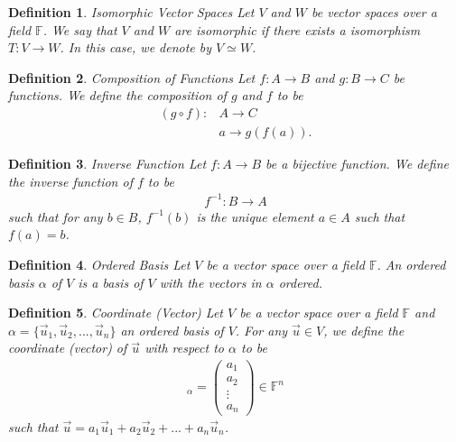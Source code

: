 \documentclass[12pt,answers]{exam}
\newcommand{\F}{\mathbb{F}}
\newtheorem{definition}{Definition}[section]
\begin{document}
\begin{definition}{Isomorphic Vector Spaces}
Let $V$ and $W$ be vector spaces over a field $\F$. We say that $V$ and $W$ are isomorphic if there exists a isomorphism $T:V\rightarrow W$. In this case, we denote by $V\simeq W$. 
\end{definition}

\begin{definition}{Composition of Functions}
Let $f:A\rightarrow B$ and $g:B\rightarrow C$ be functions. We define the composition of $g$ and $f$ to be
\begin{align*}
	(g\circ f):&A\rightarrow C \\
	& a \rightarrow g(f(a)).
\end{align*}
\end{definition}

\begin{definition}{Inverse Function}
Let $f:A\rightarrow B$ be a bijective function. We define the inverse function of $f$ to be
\begin{align*}
	f^{-1}:B\rightarrow A
\end{align*} such that for any $b\in B$, $f^{-1}(b)$ is the unique element $a\in A$ such that $f(a)=b$.
\end{definition}

\begin{definition}{Ordered Basis}
Let $V$ be a vector space over a field $\F$. An ordered basis $\alpha$ of $V$ is a basis of $V$ with the vectors in $\alpha$ ordered.
\end{definition}

\begin{definition}{Coordinate (Vector)}
Let $V$ be a vector space over a field $\F$ and $\alpha=\{\vec{u}_1,\vec{u}_{2},...,\vec{u}_n\}$ an ordered basis of $V$. For any $\vec{u}\in V$, we define the coordinate (vector) of $\vec{u}$ with respect to $\alpha$ to be
\begin{align*}
    [\vec{u}]_{\alpha}=\begin{pmatrix} a_{1} \\ a_{2} \\ \vdots \\ a_{n} \end{pmatrix} \in \F^{n}
\end{align*}
such that $\vec{u}=a_{1}\vec{u}_{1}+a_{2}\vec{u}_{2}+...+a_{n}\vec{u}_{n}$.
\end{definition}
\end{document}
